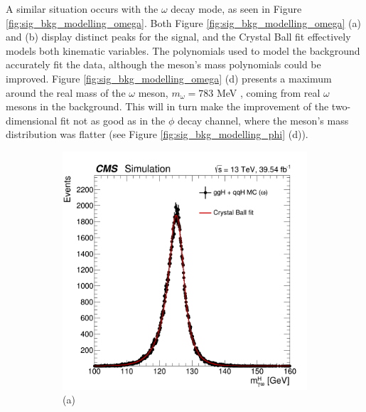 A similar situation occurs with the $\omega$ decay mode, as seen in Figure \ref{fig:sig_bkg_modelling_omega}. Both Figure \ref{fig:sig_bkg_modelling_omega} (a) and (b) display distinct peaks for the signal, and the Crystal Ball fit effectively models both kinematic variables. The polynomials used to model the background accurately fit the data, although the meson's mass polynomials could be improved. Figure \ref{fig:sig_bkg_modelling_omega} (d) presents a maximum around the real mass of the $\omega$ meson, $m_\omega = 783$ MeV \cite{PDG}, coming from real $\omega$ mesons in the background. This will in turn make the improvement of the two-dimensional fit not as good as in the $\phi$ decay channel, where the meson's mass distribution was flatter (see Figure \ref{fig:sig_bkg_modelling_phi} (d)).
\begin{figure}[!ht]
    \captionsetup[subfigure]{labelformat=empty}
    \vspace*{-0.2cm}
    \centering
    \setlength{\mylength}{\textwidth}
    \begin{subfigure}[t]{0.50\mylength}
        \centering
        \includegraphics[width=0.49\mylength]{resources/plots/Omega_fit_SGN_MH.png}
        \vspace*{-0.2cm}
        \caption{\footnotesize (a)}
    \end{subfigure}%
    \begin{subfigure}[t]{0.50\mylength}

\end{subfigure}
\end{figure}
